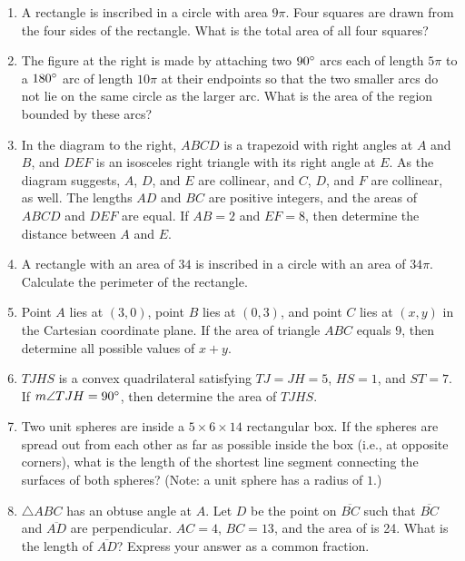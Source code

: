 \documentclass[11pt]{article}
\begin{document}
\begin{enumerate}[1.]
			\item A rectangle is inscribed in a circle with area $9\pi$. Four squares are drawn from the four sides of the rectangle. What is the total area of all four squares?
			
			\item The figure at the right is made by attaching two $90\degree$ arcs each of length $5\pi$ to a $180\degree$ arc of length $10\pi$ at their endpoints so that the two smaller arcs do not lie on the same circle as the larger arc. What is the area of the region bounded by these arcs?
			
			\item In the diagram to the right, $ABCD$ is a trapezoid with right angles at $A$ and $B$, and $DEF$ is an isosceles right triangle with its right angle at $E$. As the diagram suggests, $A$, $D$, and $E$ are collinear, and $C$, $D$, and $F$ are collinear, as well. The lengths $AD$ and $BC$ are positive integers, and the areas of $ABCD$ and $DEF$ are equal. If $AB = 2$ and $EF = 8$, then determine the distance between $A$ and $E$.
			
			\item A rectangle with an area of $34$ is inscribed in a circle with an area of $34\pi$. Calculate the perimeter of the rectangle.
			
			\item Point $A$ lies at $(3, 0)$, point $B$ lies at $(0, 3)$, and point $C$ lies at $(x, y)$ in the Cartesian coordinate plane. If the area of triangle $ABC$ equals $9$, then determine all possible values of $x + y$.
			
			\item $TJHS$ is a convex quadrilateral satisfying $TJ = JH = 5$, $HS = 1$, and $ST = 7$. If $m\angle TJH = 90\degree$, then determine the area of $TJHS$.
			
			\item Two unit spheres are inside a $5 \times 6 \times 14$ rectangular box. If the spheres are spread out from each other as far as possible inside the box (i.e., at opposite corners), what is the length of the shortest line segment connecting the surfaces of both spheres? (Note: a unit sphere has a radius of $1$.)
			
			
			\item $\triangle ABC$ has an obtuse angle at $A$. Let $D$ be the point on $\overline{BC}$ such that $\overline{BC}$ and $\overline{AD}$ are perpendicular. $AC = 4$, $BC = 13$, and the area of is 24. What is the length of $\overline{AD}$? Express your answer as a common fraction.
			

\end{enumerate}
\end{document}
